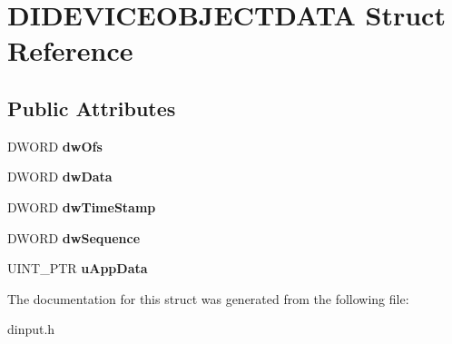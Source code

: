 \hypertarget{struct_d_i_d_e_v_i_c_e_o_b_j_e_c_t_d_a_t_a}{\section{D\-I\-D\-E\-V\-I\-C\-E\-O\-B\-J\-E\-C\-T\-D\-A\-T\-A Struct Reference}
\label{struct_d_i_d_e_v_i_c_e_o_b_j_e_c_t_d_a_t_a}
}
\subsection*{Public Attributes}
\begin{DoxyCompactItemize}
\item 
\hypertarget{struct_d_i_d_e_v_i_c_e_o_b_j_e_c_t_d_a_t_a_aae1e5fed39377aafd65e67169837a24e}{D\-W\-O\-R\-D {\bfseries dw\-Ofs}}\label{struct_d_i_d_e_v_i_c_e_o_b_j_e_c_t_d_a_t_a_aae1e5fed39377aafd65e67169837a24e}

\item 
\hypertarget{struct_d_i_d_e_v_i_c_e_o_b_j_e_c_t_d_a_t_a_a724475149bad1d223655dfaa951fdc31}{D\-W\-O\-R\-D {\bfseries dw\-Data}}\label{struct_d_i_d_e_v_i_c_e_o_b_j_e_c_t_d_a_t_a_a724475149bad1d223655dfaa951fdc31}

\item 
\hypertarget{struct_d_i_d_e_v_i_c_e_o_b_j_e_c_t_d_a_t_a_a4798874752181126bd321e71d330927c}{D\-W\-O\-R\-D {\bfseries dw\-Time\-Stamp}}\label{struct_d_i_d_e_v_i_c_e_o_b_j_e_c_t_d_a_t_a_a4798874752181126bd321e71d330927c}

\item 
\hypertarget{struct_d_i_d_e_v_i_c_e_o_b_j_e_c_t_d_a_t_a_a16e3d6a714eba78c5ab1494c0818b369}{D\-W\-O\-R\-D {\bfseries dw\-Sequence}}\label{struct_d_i_d_e_v_i_c_e_o_b_j_e_c_t_d_a_t_a_a16e3d6a714eba78c5ab1494c0818b369}

\item 
\hypertarget{struct_d_i_d_e_v_i_c_e_o_b_j_e_c_t_d_a_t_a_a367ee5cdcf4af6e3428517fa7055dd57}{U\-I\-N\-T\-\_\-\-P\-T\-R {\bfseries u\-App\-Data}}\label{struct_d_i_d_e_v_i_c_e_o_b_j_e_c_t_d_a_t_a_a367ee5cdcf4af6e3428517fa7055dd57}

\end{DoxyCompactItemize}


The documentation for this struct was generated from the following file\-:\begin{DoxyCompactItemize}
\item 
dinput.\-h\end{DoxyCompactItemize}
